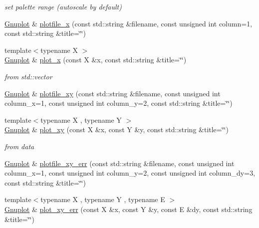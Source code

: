 \begin{DoxyCompactItemize}
\begin{DoxyCompactList}\small\item\em set palette range (autoscale by default) \end{DoxyCompactList}\item 
\hyperlink{classkukadu_1_1Gnuplot}{Gnuplot} \& \hyperlink{classkukadu_1_1Gnuplot_a6f7bb713dd84b3ad5a737f7005411bfc}{plotfile\-\_\-x} (const std\-::string \&filename, const unsigned int column=1, const std\-::string \&title=\char`\"{}\char`\"{})
\item 
{\footnotesize template$<$typename X $>$ }\\\hyperlink{classkukadu_1_1Gnuplot}{Gnuplot} \& \hyperlink{classkukadu_1_1Gnuplot_af942480ea37a33cbd5bef00e8592404d}{plot\-\_\-x} (const X \&x, const std\-::string \&title=\char`\"{}\char`\"{})
\begin{DoxyCompactList}\small\item\em from std\-::vector \end{DoxyCompactList}\item 
\hyperlink{classkukadu_1_1Gnuplot}{Gnuplot} \& \hyperlink{classkukadu_1_1Gnuplot_a69a964c20551ba369846d10c74e53d51}{plotfile\-\_\-xy} (const std\-::string \&filename, const unsigned int column\-\_\-x=1, const unsigned int column\-\_\-y=2, const std\-::string \&title=\char`\"{}\char`\"{})
\item 
{\footnotesize template$<$typename X , typename Y $>$ }\\\hyperlink{classkukadu_1_1Gnuplot}{Gnuplot} \& \hyperlink{classkukadu_1_1Gnuplot_ac80122ec909d18c1c1b22bd7c3570fb9}{plot\-\_\-xy} (const X \&x, const Y \&y, const std\-::string \&title=\char`\"{}\char`\"{})
\begin{DoxyCompactList}\small\item\em from data \end{DoxyCompactList}\item 
\hyperlink{classkukadu_1_1Gnuplot}{Gnuplot} \& \hyperlink{classkukadu_1_1Gnuplot_a78fb33f6b8f7c169bad61f7767b4452f}{plotfile\-\_\-xy\-\_\-err} (const std\-::string \&filename, const unsigned int column\-\_\-x=1, const unsigned int column\-\_\-y=2, const unsigned int column\-\_\-dy=3, const std\-::string \&title=\char`\"{}\char`\"{})
\item 
{\footnotesize template$<$typename X , typename Y , typename E $>$ }\\\hyperlink{classkukadu_1_1Gnuplot}{Gnuplot} \& \hyperlink{classkukadu_1_1Gnuplot_a4cc62bb2504de6635ed6b47cbaf02c1c}{plot\-\_\-xy\-\_\-err} (const X \&x, const Y \&y, const E \&dy, const std\-::string \&title=\char`\"{}\char`\"{})

\end{DoxyCompactItemize}
